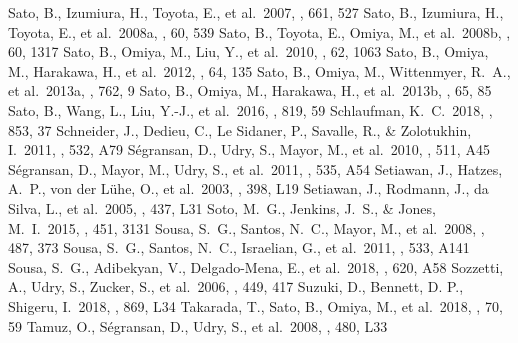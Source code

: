 \documentclass[twocolumn]{aastex62}
\begin{document}
\begin{CJK*}{UTF8}{min}
\begin{thebibliography}{}
 Sato, B., Izumiura, H., Toyota, E., et al.\ 2007, \apj, 661, 527
 Sato, B., Izumiura, H., Toyota, E., et al.\ 2008a, \pasj, 60, 539
 Sato, B., Toyota, E., Omiya, M., et al.\ 2008b, \pasj, 60, 1317
 Sato, B., Omiya, M., Liu, Y., et al.\ 2010, \pasj, 62, 1063
 Sato, B., Omiya, M., Harakawa, H., et al.\ 2012, \pasj, 64, 135
 Sato, B., Omiya, M., Wittenmyer, R.~A., et al.\ 2013a, \apj, 762, 9
 Sato, B., Omiya, M., Harakawa, H., et al.\ 2013b, \pasj, 65, 85
 Sato, B., Wang, L., Liu, Y.-J., et al.\ 2016, \apj, 819, 59
 Schlaufman, K.~C.\ 2018, \apj, 853, 37
 Schneider, J., Dedieu, C., Le Sidaner, P., Savalle, R., \& Zolotukhin, I.\ 2011, \aap, 532, A79
 S{\'e}gransan, D., Udry, S., Mayor, M., et al.\ 2010, \aap, 511, A45
 S{\'e}gransan, D., Mayor, M., Udry, S., et al.\ 2011, \aap, 535, A54
 Setiawan, J., Hatzes, A.~P., von der L{\"u}he, O., et al.\ 2003, \aap, 398, L19
 Setiawan, J., Rodmann, J., da Silva, L., et al.\ 2005, \aap, 437, L31
 Soto, M.~G., Jenkins, J.~S., \& Jones, M.~I.\ 2015, \mnras, 451, 3131
 Sousa, S.~G., Santos, N.~C., Mayor, M., et al.\ 2008, \aap, 487, 373
 Sousa, S.~G., Santos, N.~C., Israelian, G., et al.\ 2011, \aap, 533, A141
 Sousa, S.~G., Adibekyan, V., Delgado-Mena, E., et al.\ 2018, \aap, 620, A58
 Sozzetti, A., Udry, S., Zucker, S., et al.\ 2006, \aap, 449, 417
 Suzuki, D., Bennett, D. P., Shigeru, I.\ 2018, \apjl, 869, L34
 Takarada, T., Sato, B., Omiya, M., et al.\ 2018, \pasj, 70, 59
 Tamuz, O., S{\'e}gransan, D., Udry, S., et al.\ 2008, \aap, 480, L33

\end{thebibliography}
\end{CJK*}
\end{document}
